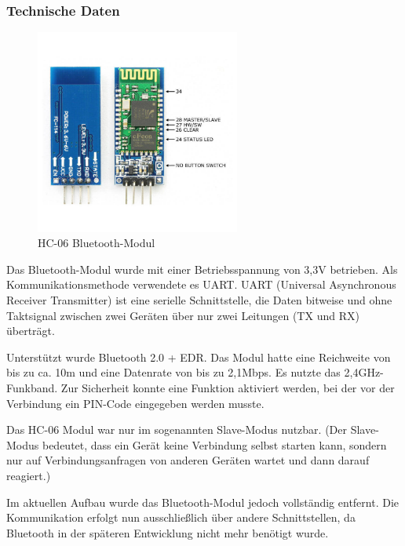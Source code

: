\subsubsection{Technische Daten}
\begin{figure}[H]
    \centering
    \includegraphics[width=0.6\textwidth]{img/Hardware/hc06.png}
    \caption{HC-06 Bluetooth-Modul}
    \label{fig:hc06}
\end{figure}
Das Bluetooth-Modul wurde mit einer Betriebsspannung von 3,3V betrieben. Als Kommunikationsmethode verwendete es UART.
UART (Universal Asynchronous Receiver Transmitter) ist eine serielle Schnittstelle, die Daten bitweise und ohne Taktsignal zwischen zwei Geräten über nur zwei Leitungen (TX und RX) überträgt.

Unterstützt wurde Bluetooth 2.0 + EDR. Das Modul hatte eine Reichweite von bis zu ca. 10m und eine Datenrate von bis zu 2,1Mbps. Es nutzte das 2,4GHz-Funkband. Zur Sicherheit konnte eine Funktion aktiviert werden, bei der vor der Verbindung ein PIN-Code eingegeben werden musste.

Das HC-06 Modul war nur im sogenannten Slave-Modus nutzbar.
(Der Slave-Modus bedeutet, dass ein Gerät keine Verbindung selbst starten kann, sondern nur auf Verbindungsanfragen von anderen Geräten wartet und dann darauf reagiert.)

Im aktuellen Aufbau wurde das Bluetooth-Modul jedoch vollständig entfernt. Die Kommunikation erfolgt nun ausschließlich über andere Schnittstellen, da Bluetooth in der späteren Entwicklung nicht mehr benötigt wurde.
